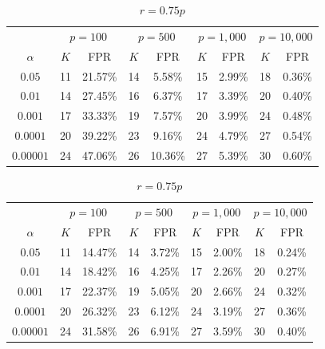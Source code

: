 \documentclass[runningheads]{llncs}
\begin{document}
\begin{table}[H]

\begin{subtable}{\textwidth}
\centering
\caption{$r = 0.50p$}
\begin{tabular}{c|cc|cc|cc|cc}
\toprule
& \multicolumn{2}{c|}{$p = 100$}
& \multicolumn{2}{c|}{$p = 500$}
& \multicolumn{2}{c|}{$p = 1{,}000$}
& \multicolumn{2}{c}{$p = 10{,}000$} \\
$\alpha$
& $K$ & FPR
& $K$ & FPR
& $K$ & FPR
& $K$ & FPR \\
\midrule
$0.05$    & 11 & 21.57\% & 14 & 5.58\% & 15 & 2.99\% & 18 & 0.36\% \\
$0.01$    & 14 & 27.45\% & 16 & 6.37\% & 17 & 3.39\% & 20 & 0.40\% \\
$0.001$   & 17 & 33.33\% & 19 & 7.57\% & 20 & 3.99\% & 24 & 0.48\% \\
$0.0001$  & 20 & 39.22\% & 23 & 9.16\% & 24 & 4.79\% & 27 & 0.54\% \\
$0.00001$ & 24 & 47.06\% & 26 & 10.36\% & 27 & 5.39\% & 30 & 0.60\% \\
\bottomrule
\end{tabular}
\end{subtable}


\begin{subtable}{\textwidth}
\centering
\caption{$r = 0.75p$}
\begin{tabular}{c|cc|cc|cc|cc}
\toprule
& \multicolumn{2}{c|}{$p = 100$}
& \multicolumn{2}{c|}{$p = 500$}
& \multicolumn{2}{c|}{$p = 1{,}000$}
& \multicolumn{2}{c}{$p = 10{,}000$} \\
$\alpha$
& $K$ & FPR
& $K$ & FPR
& $K$ & FPR
& $K$ & FPR \\
\midrule
$0.05$    & 11 & 14.47\% & 14 & 3.72\% & 15 & 2.00\% & 18 & 0.24\% \\
$0.01$    & 14 & 18.42\% & 16 & 4.25\% & 17 & 2.26\% & 20 & 0.27\% \\
$0.001$   & 17 & 22.37\% & 19 & 5.05\% & 20 & 2.66\% & 24 & 0.32\% \\
$0.0001$  & 20 & 26.32\% & 23 & 6.12\% & 24 & 3.19\% & 27 & 0.36\% \\
$0.00001$ & 24 & 31.58\% & 26 & 6.91\% & 27 & 3.59\% & 30 & 0.40\% \\
\bottomrule
\end{tabular}
\end{subtable}



\end{table}
\end{document}
